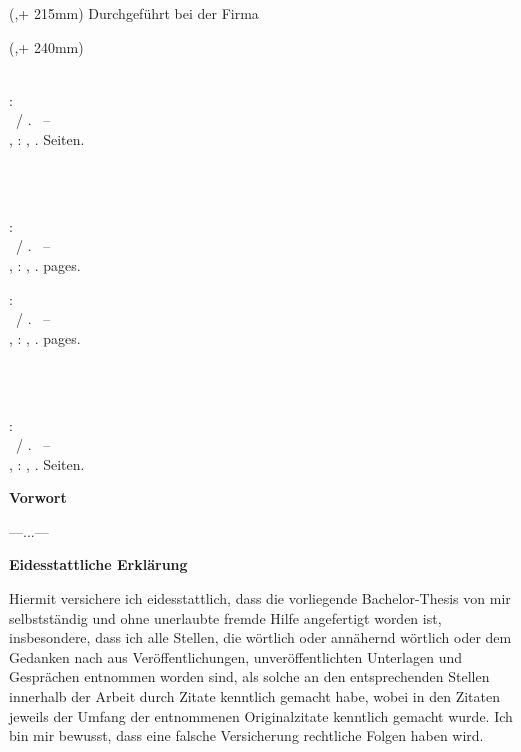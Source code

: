 \begin{textblock*}{\seitenbreite}(\bindekorrektur,\seitenanfang + 215mm)
  \centering\large 
  \textsf{Durchgeführt bei der Firma \hsmafirma}
\end{textblock*}

\begin{textblock*}{\seitenbreite}(\bindekorrektur,\seitenanfang + 240mm)
  \centering\large\sffamily
  \hsmatutor \\
  \vspace{2mm}
  \hsmabetreuer\\
  \vspace{2mm}
  \hsmazweitkorrektor
\end{textblock*}

\null\newpage
\thispagestyle{empty}
  
\newcommand{\hsmabibde}{\begin{small}\textbf{\hsmaautorbib}: \\ \hsmatitelde \ / \hsmaautor. \ -- \\ \hsmatypde, \hsmaort : \hsmakoerperschaftde, \hsmajahr. \pageref{lastpage} Seiten.\end{small}}

\newcommand{\hsmabiben}{\begin{small}\textbf{\hsmaautorbib}: \\ \hsmatitelen \ / \hsmaautor. \ -- \\ \hsmatypen, \hsmaort : \hsmakoerperschaften, \hsmajahr. \pageref{lastpage} pages. \end{small}}

%
  {\hsmabibde \\ \vspace{0.5cm} \\ \hsmabiben}
  {\hsmabiben \\ \vspace{0.5cm} \\ \hsmabibde}


\clearpage\setcounter{page}{1}
\thispagestyle{empty}
\textsf{\large\textbf{Vorwort}}

---...---

\clearpage
\thispagestyle{empty}
\textsf{\large\textbf{Eidesstattliche Erklärung}}

Hiermit versichere ich eidesstattlich, dass die vorliegende Bachelor-Thesis von mir selbstständig
und ohne unerlaubte fremde Hilfe angefertigt worden ist, insbesondere, dass ich alle Stellen, die wörtlich oder annähernd wörtlich oder dem Gedanken nach aus Veröffentlichungen, unveröffentlichten Unterlagen und Gesprächen entnommen worden sind, als solche an den entsprechenden Stellen innerhalb der Arbeit durch Zitate kenntlich gemacht habe, wobei in den Zitaten jeweils der Umfang der entnommenen Originalzitate kenntlich gemacht wurde. Ich bin mir bewusst, dass eine falsche Versicherung rechtliche Folgen haben wird.

